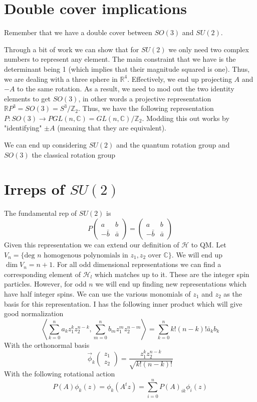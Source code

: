 \section{Double cover implications}
Remember that we have a double cover between $SO(3)$ and $SU(2)$.

Through a bit of work we can show that for $SU(2)$ we only need two complex
numbers to represent any element. The main constraint that we have is the
determinant being 1 (which implies that their magnitude squared is one). Thus, 
we are dealing with a three sphere in $\mathbb{R}^4$. Effectively, we end up
projecting $A$ and $-A$ to the same rotation. As a result, we need to mod
out the two identity elements to get $SO(3)$, in other words a projective 
representation $\mathbb{R}P^3 = SO(3) = S^3 / \mathbb{Z}_2$. Thus,
we have the following representation
$P: SO(3) \rightarrow PGL(n, \mathbb{C}) = GL(n, \mathbb{C}) / \mathbb{Z}_2$.
Modding this out works by "identifying" $\pm A$ (meaning that they are equivalent).

We can end up considering $SU(2)$ and the quantum rotation group and $SO(3)$ the classical
rotation group

\section{Irreps of $SU(2)$}
The fundamental rep of $SU(2)$ is 
$$
    P
    \begin{pmatrix}
        a & b \\
        -\bar{b} & \bar{a}
    \end{pmatrix} = 
    \begin{pmatrix}
        a & b \\
        -\bar{b} & \bar{a}
    \end{pmatrix}
$$
Given this representation we can extend our definition of $\mathcal{H}$ to QM.
Let
$V_n = \{ \text{deg } n \text{ homogenous polynomials in } z_1, z_2 \text{ over } \mathbb{C} \}$.
We will end up $\dim V_n = n + 1$. For all odd dimensional representations we can find
a corresponding element of $\mathcal{H}_l$ which matches up to it. These are the integer
spin particles. However, for odd $n$ we will end up finding new representations
which have half integer spins. We can use the various monomials of $z_1$ and $z_2$ as the
basis for this representation. I has the following inner product which will give good
normalization
$$
    \left<
        \sum_{k=0}^n a_k z_1^k z_2^{n-k},
        \sum_{m=0}^n b_m z_1^m z_2^{n-m}
    \right> = \sum_{k=0}^n k! (n-k)! \bar{a}_k b_k
$$
With the orthonormal basis
$$
    \vec{\phi}_k \begin{pmatrix} z_1 \\ z_2 \end{pmatrix} =
    \frac{z_1^k z_2^{n-k}}{\sqrt{k! (n-k)!}}
$$
With the following rotational action
$$
    P(A) \phi_k(z) = \phi_k(A^t z) = 
    \sum_{i=0}^n P(A)_{ik} \phi_i (z)
$$

